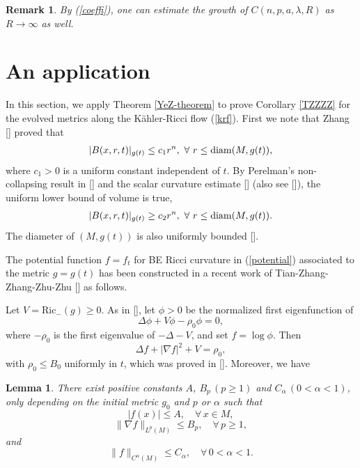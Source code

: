 \documentclass[11pt]{amsart}
\numberwithin{equation}{section}
\newtheorem{lemma}[theorem]{Lemma}
\newtheorem{remark}[theorem]{Remark}
\begin{document}
\begin{remark}
	By (\ref{coeffi}), one can   estimate the growth of $C(n,p,a,\lambda,R)$ as $R\to\infty$ as well.
\end{remark}

\section{An application}\label{sec5}

In this  section, we apply Theorem \ref{YeZ-theorem} to  prove  Corollary \ref{TZZZZ} for  the evolved metrics along the K\"ahler-Ricci flow (\ref{krf}). First we note that Zhang [\cite{Zhang}] proved that
\begin{align}\label{Zhang}|B(x, r, t)|_{g(t)} \leq c_1 r^n, ~\forall ~r\le {\rm diam}(M, g(t)),
\end{align}
where $c_1>0$ is a uniform constant independent of $t$.  By Perelman's non-collapsing result in [\cite{Pe}]  and the scalar curvature estimate [\cite{Pe2}] (also see [\cite{ST}]),   the uniform lower bound of volume is true,
\begin{align}\label{Pere}
	|B(x, r, t)|_{g(t)} \ge c_2 r^n, ~\forall ~r\le {\rm diam}(M, g(t)).
\end{align}
The diameter of $(M, g(t))$ is also uniformly bounded [\cite{Pe2}].

The potential function $f=f_t$ for  BE Ricci curvature in (\ref{potential}) associated to the metric $g=g(t)$  has been  constructed  in a recent work of Tian-Zhang-Zhang-Zhu-Zhu [\cite{TZZZZ}]  as follows.


Let $V=\mathrm{Ric}_-(g)\ge 0$. As in [\cite{TZZZZ}], let $\phi>0$ be the normalized first eigenfunction of
\begin{equation}\label{eigen}
	\Delta\phi+V\phi-\rho_0\phi=0,
\end{equation}
where $-\rho_0$ is the first eigenvalue of $-\Delta-V$, and set $f=\log\phi$. Then
\begin{equation}\label{eigenfcn}
	\Delta f+|\nabla f|^2+V=\rho_0,
\end{equation}
with $\rho_0\le B_0$ uniformly in $t$, which was proved in [\cite{TZZZZ}]. Moreover, we have 

\begin{lemma}\label{f}
	There exist positive constants $A$, $B_p\,(p\geq 1)$ and $C_\alpha\,(0<\alpha<1)$, only depending on the initial metric  $g_0$ and $p$ or $\alpha$  such that
	\begin{equation}\label{f1}
		|f(x)|\leq A,\quad \forall\, x\in M,
	\end{equation}
	\begin{equation}\label{f2}
		\|\nabla f\|_{L^p(M)}\leq B_p, \quad\forall\, p\geq 1,
	\end{equation}
	and
	\begin{equation}\label{f3}
		\|f\|_{C^{\alpha}(M)}\leq C_\alpha,\quad\forall\, 0<\alpha<1.
	\end{equation}
\end{lemma}
\end{document}
